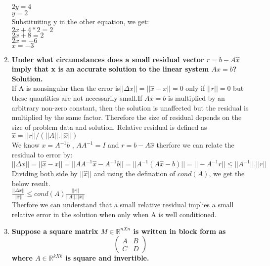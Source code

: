 \documentclass[12pt, oneside]{article}   	%
\begin{document}
\begin{enumerate}
 $2y=4$\\
 $y=2$\\
Substituiting y in the other equation, we get:\\
$ 2x+4*2=2$ \\
$ 2x+8=2$ \\
$2x=-6$\\
$x=-3$\\



\item \textbf{Under what circumstances does a small residual vector $r = b - A\hat{x}$ imply that x is an accurate solution to the linear system $Ax=b$?}\\

\textbf{Solution.}\\

If A is nonsingular then the error is$||\Delta x||=||\hat{x} -x||=0$ only if $||r||=0$ but these quantities are not necessarily small.If $Ax=b$ is multiplied by an arbitrary non-zero constant, then the solution is unaffected but the residual is multiplied by the same factor. Therefore the size of residual depends on the size of problem data and solution. Relative residual is defined as $\hat{x} = ||r||/(||A||.||\hat{x}||)$\\


We know $x=A^{-1}b$ , $AA^{-1}=I$ and $r = b - A\hat{x}$   therfore we can relate the residual to error by:\\

$||\Delta x||=||\hat{x} -x||=||AA^{-1}\hat{x} - A^{-1}b|| = ||A^{-1}(A\hat{x} - b)|| = ||-A^{-1}r||  \leq ||A^{-1}|| .||r|| $ \\

Dividing both side by $||\hat{x}|| $ and using the defination of $cond(A)$, we get the below result.\\

$\frac{||\Delta x||}{||\hat{x}|| } \leq cond(A) \frac{||r||}{||A||.||\hat{x}||}$\\

Therfore we can understand that a small relative residual implies a small relative error in the solution when only when A is well conditioned.


\item \textbf{Suppose a square matrix $ M \in \mathbb{R}^{nXn}$ is written in block form as  
$$
\begin{pmatrix}
A& B\\
C & D
\end{pmatrix}
$$
where $A \in \mathbb{R}^{kXk}$ is square and invertible.}
 

\end{enumerate}
\end{document}

